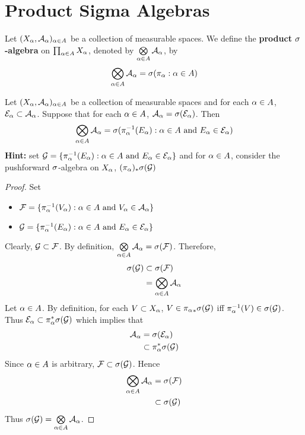 \documentclass{book}
\begin{document}
	\newpage
	\section{Product Sigma Algebras}
	
	\begin{defn} 
		Let $(X_{\alpha}, \mathcal{A}_{\alpha})_{\alpha \in A}$ be a collection of measurable spaces. We define the \textbf{product $\sigma$-algebra} on $\prod_{\alpha \in A}X_{\alpha}$, denoted by $\bigotimes\limits_{\alpha \in A} \mathcal{A}_{\alpha}$, by $$\bigotimes\limits_{\alpha \in A} \mathcal{A}_{\alpha} = \sigma(\pi_{\alpha}: \alpha \in A)$$
	\end{defn}

	\begin{ex} 
		Let $(X_{\alpha}, \mathcal{A}_{\alpha})_{\alpha \in A}$ be a collection of measurable spaces and for each $\alpha \in A$, $\mathcal{E}_{\alpha} \subset \mathcal{A}_{\alpha}$. Suppose that for each $\alpha \in A$, $\mathcal{A}_{\alpha} = \sigma(\mathcal{E}_{\alpha})$. Then 
		$$\bigotimes\limits_{\alpha \in A} \mathcal{A}_{\alpha} = \sigma( \pi_{\alpha}^{-1}(E_{\alpha}): \alpha \in A \text{ and } E_{\alpha} \in \mathcal{E}_{\alpha})$$ 
		\textbf{Hint:} set $\mathcal{G} = \{\pi_{\alpha}^{-1}(E_{\alpha}): \alpha \in A \text{ and } E_{\alpha} \in \mathcal{E}_{\alpha}\}$ and for $\alpha \in A$, consider the pushforward $\sigma$-algebra on $X_{\alpha}$, $(\pi_{\alpha})_* \sigma( \mathcal{G})$
	\end{ex}

 	\begin{proof}
 		Set 
 		\begin{itemize}
 			\item $\mathcal{F} = \{\pi_{\alpha}^{-1}(V_{\alpha}): \alpha \in A \text{ and } V_{\alpha} \in \mathcal{A}_{\alpha}\}$ 
 			\item $\mathcal{G} = \{\pi_{\alpha}^{-1}(E_{\alpha}): \alpha \in A \text{ and } E_{\alpha} \in \mathcal{E}_{\alpha}\}$
 		\end{itemize}
 		Clearly, $\mathcal{G} \subset \mathcal{F}$. By definition, $\bigotimes\limits_{\alpha \in A} \mathcal{A}_{\alpha} = \sigma(\mathcal{F})$. Therefore, 
 		\begin{align*}
 			\sigma(\mathcal{G}) 
 			& \subset \sigma(\mathcal{F}) \\
 			& = \bigotimes\limits_{\alpha \in A} \mathcal{A}_{\alpha}
 		\end{align*}
 		Let $\alpha \in A$. By definition, for each $V \subset X_{\alpha}$, $V \in {\pi_{\alpha}}_* \sigma(\mathcal{G})$ iff $\pi_{\alpha}^{-1}(V) \in \sigma(\mathcal{G})$. Thus $\mathcal{E}_{\alpha} \subset \pi_{\alpha}^* \sigma(\mathcal{G})$ which implies that 
 		\begin{align*}
 			\mathcal{A}_{\alpha} 
 			& = \sigma(\mathcal{E}_{\alpha}) \\
 			& \subset \pi_{\alpha}^* \sigma(\mathcal{G})
 		\end{align*}
 		Since $\alpha \in A$ is arbitrary, $\mathcal{F} \subset \sigma(\mathcal{G})$. Hence 
 		\begin{align*}
 			\bigotimes\limits_{\alpha \in A} \mathcal{A}_{\alpha} 
 			& = \sigma(\mathcal{F}) \\
 			& \subset \sigma(\mathcal{G})
 		\end{align*}
 		Thus $\sigma(\mathcal{G}) = \bigotimes\limits_{\alpha \in A} \mathcal{A}_{\alpha}$.
 	\end{proof}
 
\end{document}

